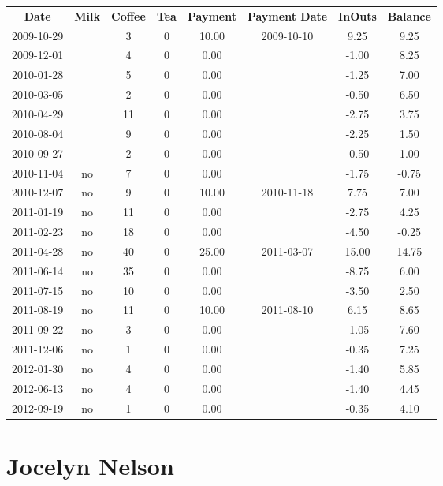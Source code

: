 \begin{center}
\begin{tabular}{cccccccc}
\textbf{Date} & \textbf{Milk} & \textbf{Coffee} & \textbf{Tea} & \textbf{Payment} & \textbf{Payment Date} & \textbf{InOuts} & \textbf{Balance} \\
2009-10-29 &  &  3 & 0 & 10.00 & 2009-10-10 &  9.25 &  9.25\\ 
2009-12-01 &  &  4 & 0 &  0.00 &  & -1.00 &  8.25\\ 
2010-01-28 &  &  5 & 0 &  0.00 &  & -1.25 &  7.00\\ 
2010-03-05 &  &  2 & 0 &  0.00 &  & -0.50 &  6.50\\ 
2010-04-29 &  & 11 & 0 &  0.00 &  & -2.75 &  3.75\\ 
2010-08-04 &  &  9 & 0 &  0.00 &  & -2.25 &  1.50\\ 
2010-09-27 &  &  2 & 0 &  0.00 &  & -0.50 &  1.00\\ 
2010-11-04 & no &  7 & 0 &  0.00 &  & -1.75 & -0.75\\ 
2010-12-07 & no &  9 & 0 & 10.00 & 2010-11-18 &  7.75 &  7.00\\ 
2011-01-19 & no & 11 & 0 &  0.00 &  & -2.75 &  4.25\\ 
2011-02-23 & no & 18 & 0 &  0.00 &  & -4.50 & -0.25\\ 
2011-04-28 & no & 40 & 0 & 25.00 & 2011-03-07 & 15.00 & 14.75\\ 
2011-06-14 & no & 35 & 0 &  0.00 &  & -8.75 &  6.00\\ 
2011-07-15 & no & 10 & 0 &  0.00 &  & -3.50 &  2.50\\ 
2011-08-19 & no & 11 & 0 & 10.00 & 2011-08-10 &  6.15 &  8.65\\ 
2011-09-22 & no &  3 & 0 &  0.00 &  & -1.05 &  7.60\\ 
2011-12-06 & no &  1 & 0 &  0.00 &  & -0.35 &  7.25\\ 
2012-01-30 & no &  4 & 0 &  0.00 &  & -1.40 &  5.85\\ 
2012-06-13 & no &  4 & 0 &  0.00 &  & -1.40 &  4.45\\ 
2012-09-19 & no &  1 & 0 &  0.00 &  & -0.35 &  4.10
\end{tabular}
\end{center}

\section{Jocelyn Nelson}

